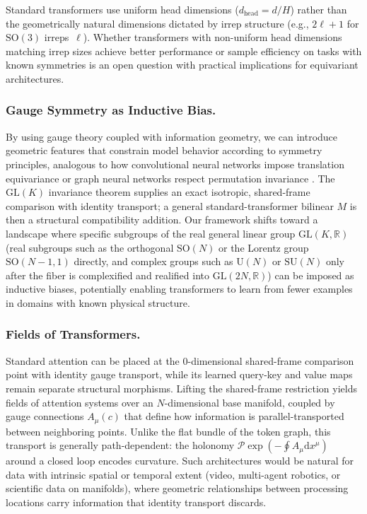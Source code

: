 \documentclass[twoside,11pt]{article}
\begin{document}
Standard transformers use uniform head dimensions ($d_{\mathrm{head}} = d/H$) rather than the geometrically natural dimensions dictated by irrep structure (e.g., $2\ell + 1$ for $\mathrm{SO}(3)$ irreps~$\ell$). Whether transformers with non-uniform head dimensions matching irrep sizes achieve better performance or sample efficiency on tasks with known symmetries is an open question with practical implications for equivariant architectures.

\subsubsection{Gauge Symmetry as Inductive Bias.}

By using gauge theory coupled with information geometry, we can introduce geometric features that constrain model behavior according to symmetry principles, analogous to how convolutional neural networks impose translation equivariance or graph neural networks respect permutation invariance \citep{finzi2020generalizing,weiler20183d,kondor2018generalization}. The $\mathrm{GL}(K)$ invariance theorem supplies an exact isotropic, shared-frame comparison with identity transport; a general standard-transformer bilinear $M$ is then a structural compatibility addition. Our framework shifts toward a landscape where specific subgroups of the real general linear group $\mathrm{GL}(K,\mathbb{R})$ (real subgroups such as the orthogonal $\mathrm{SO}(N)$ or the Lorentz group $\mathrm{SO}(N-1,1)$ directly, and complex groups such as $\mathrm{U}(N)$ or $\mathrm{SU}(N)$ only after the fiber is complexified and realified into $\mathrm{GL}(2N,\mathbb{R})$) can be imposed as inductive biases, potentially enabling transformers to learn from fewer examples in domains with known physical structure.

\subsubsection{Fields of Transformers.}

Standard attention can be placed at the 0-dimensional shared-frame comparison point with identity gauge transport, while its learned query-key and value maps remain separate structural morphisms. Lifting the shared-frame restriction yields fields of attention systems over an $N$-dimensional base manifold, coupled by gauge connections $A_\mu(c)$ that define how information is parallel-transported between neighboring points. Unlike the flat bundle of the token graph, this transport is generally path-dependent: the holonomy $\mathcal{P}\exp \left(-\oint A_\mu \mathrm{d}x^\mu\right)$ around a closed loop encodes curvature. Such architectures would be natural for data with intrinsic spatial or temporal extent (video, multi-agent robotics, or scientific data on manifolds), where geometric relationships between processing locations carry information that identity transport discards.
\end{document}
